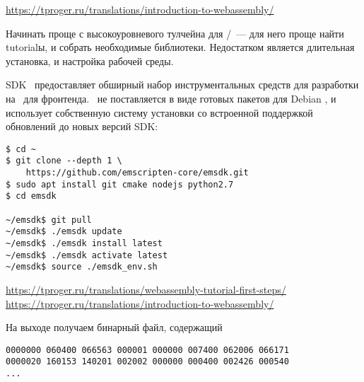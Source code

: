 \secdown

\noindent
\url{https://tproger.ru/translations/introduction-to-webassembly/}

\bigskip
Начинать проще с высокоуровневого тулчейна для \emc/\cpp\ --- для него проще
найти tutorialы, и собрать необходимые библиотеки. Недостатком является
длительная установка, и настройка рабочей среды. 


\noindent
SDK \ems\ предоставляет обширный набор инструментальных средств для разработки
на \cpp\ для фронтенда. \ems\ не поставляется в виде готовых пакетов для Debian
\linux, и использует собственную систему установки со встроенной поддержкой
обновлений до новых версий SDK:
\begin{lstlisting}
$ cd ~
$ git clone --depth 1 \
	https://github.com/emscripten-core/emsdk.git
$ sudo apt install git cmake nodejs python2.7
$ cd emsdk

~/emsdk$ git pull
~/emsdk$ ./emsdk update
~/emsdk$ ./emsdk install latest
~/emsdk$ ./emsdk activate latest
~/emsdk$ source ./emsdk_env.sh
\end{lstlisting}


\noindent
\url{https://tproger.ru/translations/webassembly-tutorial-first-steps/}\\
\url{https://tproger.ru/translations/introduction-to-webassembly/}

\bigskip
{}

\bigskip
{}
На выходе получаем бинарный файл, содержащий 
\begin{lstlisting}[title=none.wasm]
0000000 060400 066563 000001 000000 007400 062006 066171
0000020 160153 140201 002002 000000 000400 002426 000540
...
\end{lstlisting}


\secup
